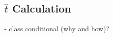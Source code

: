 \subsection{\texorpdfstring{$\hat{t}$}{t̂} Calculation}

\noindent - class conditional (why and how)?